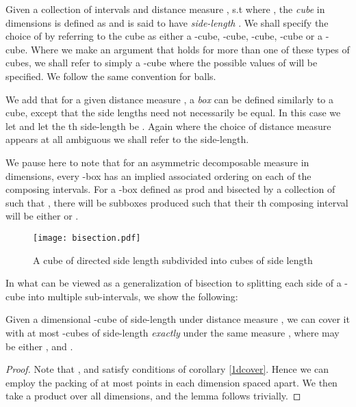 \documentclass[11pt]{myclass}
\begin{document}
\begin{defn} \label{cube}
 Given a collection of  intervals  and distance measure , s.t  where , the \emph{cube} in  dimensions is defined as  and is said to have \emph{side-length} . We shall specify the choice of  by referring to the cube as either a -cube, -cube, -cube, -cube or a
 -cube. Where we make an argument that holds for more than one of these types of cubes, we shall refer to simply a
 -cube where the possible values of  will be specified. We follow the same convention for balls.
 \end{defn}

  We add that for a given distance measure , a \emph{box}  can be defined similarly to
a cube, except that the side lengths need not necessarily be equal. In this case we let 
and let the th side-length be . Again where the choice of distance measure  appears at all ambiguous we shall refer to the  side-length. 

We pause here to note that for an asymmetric decomposable measure  in  dimensions, every -box has an implied associated ordering on each of the  composing intervals. For a -box defined as prod  and bisected by a collection of 
such that , there will be  subboxes produced such that their th composing interval will
be either  or .

\begin{figure}[H]
  \begin{center}
    \texttt{[image: bisection.pdf]}
  \end{center}
  \caption{A cube of directed side length  subdivided into cubes of side length  }
  \label{fig:bisection}
\end{figure}

 In what can be viewed as a generalization of bisection to splitting each side of a -cube into multiple sub-intervals,
 we show the following:
 
\begin{lemma}\label{scubeCover}
Given a  dimensional -cube  of side-length  under distance measure , 
we can cover it with at most  -cubes of side-length \emph{exactly}  under the same measure , where  may be either ,  and . 
\end{lemma}

\begin{proof}
Note that ,  and  satisfy conditions of corollary \ref{1dcover}. 
Hence we can employ the packing of at most  points in each dimension spaced  apart. 
We then take a product over all  dimensions, and the lemma follows trivially. 
\end{proof}
 
\end{document}

